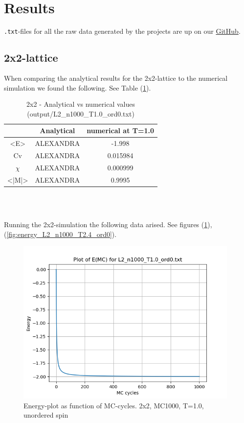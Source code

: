 \documentclass{article}
\begin{document}
\section{Results} \label{sec:Results}

  \texttt{.txt}-files for all the raw data generated by the projects are up on our \href{https://github.com/Erikbgram/Fys3150}{GitHub}. \\

\subsection{2x2-lattice}

When comparing the analytical results for the 2x2-lattice to the numerical simulation we found the following. See Table (\ref{tab:analyticalvsnumerical}).

  \begin{table}[ht]
    \centering
    \caption{2x2 - Analytical vs numerical values (output/L2\_n1000\_T1.0\_ord0.txt)}
    \vspace{2mm}
    \label{tab:analyticalvsnumerical}
    \begin{tabular}{|c|c|c|}
        \hline
         & Analytical & numerical at T=1.0\\
        \hline \hline
        <E> & ALEXANDRA & -1.998 \\
        Cv & ALEXANDRA & 0.015984 \\
        $\chi$ & ALEXANDRA & 0.000999 \\
        <|M|> & ALEXANDRA & 0.9995 \\
        \hline
    \end{tabular} \\
    \hspace{0pt}\\
  \end{table}

Running the 2x2-simulation the following data arised. See figures (\ref{fig:energy_L2_n1000_T1.0_ord0}), (\ref{fig:energy_L2_n1000_T2.4_ord0}).

\begin{figure}[ht]
    \centering
    \includegraphics[width = 11cm]{img/energy_L2_n1000_T10_ord0.png}
    \caption{Energy-plot as function of MC-cycles. 2x2, MC1000, T=1.0, unordered spin}
    \label{fig:energy_L2_n1000_T1.0_ord0}
  \end{figure}
\end{document}
